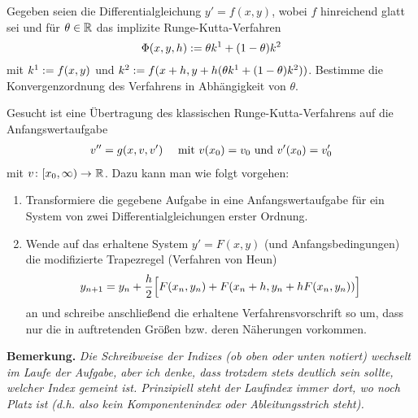 \begin{exercisePage}
	
	\setcounter{taskcount}{8}
	\begin{homework}
		Gegeben seien die Differentialgleichung $y' = f(x,y)$, wobei $f$ hinreichend glatt sei und für $\theta \in \mathbb{R}$ das implizite Runge-Kutta-Verfahren
		\begin{equation*}
			\Phi(x,y,h) \mathrel{:=} \theta k^1 + (1-\theta)k^2
		\end{equation*}
		mit $k^1 \mathrel{:=} f(x,y)$ und $k^2 \mathrel{:=} f(x+h,y+h(\theta k^1 + (1-\theta)k^2))$. Bestimme die Konvergenzordnung des Verfahrens in Abhängigkeit von $\theta$.
	\end{homework}

	\begin{homework}
		Gesucht ist eine Übertragung des klassischen Runge-Kutta-Verfahrens auf die Anfangswertaufgabe 
		\begin{align}
			v'' = g(x,v,v') \quad \text{ mit } v(x_0) = v_0 \text{ und } v'(x_0) = v_0' \label{t10: aw}
		\end{align}
		mit $\abb{v}{[x_0, \infty)}{\R}$. Dazu kann man wie folgt vorgehen:
		\begin{enumerate}[leftmargin=*, nolistsep, label=(\alph*)]
			\item Transformiere die gegebene Aufgabe in eine Anfangswertaufgabe für ein System von zwei Differentialgleichungen erster Ordnung.
			\item Wende auf das erhaltene System $y' = F(x,y)$ (und Anfangsbedingungen) die modifizierte Trapezregel (Verfahren von Heun) 
			\begin{equation*}
				y_{n+1} = y_n + \frac{h}{2} \Bigl[ F(x_n,y_n) + F(x_n + h , y_n + h F(x_n,y_n)) \Bigr]
			\end{equation*}
			an und schreibe anschließend die erhaltene Verfahrensvorschrift so um, dass nur die in 
			auftretenden Größen bzw. deren Näherungen vorkommen.
		\end{enumerate}
	\end{homework}

	\textbf{Bemerkung.} \textit{Die Schreibweise der Indizes (ob oben oder unten notiert) wechselt im Laufe der Aufgabe, aber ich denke, dass trotzdem stets deutlich sein sollte, welcher Index gemeint ist. Prinzipiell steht der Laufindex immer dort, wo noch Platz ist (d.h. also kein Komponentenindex oder Ableitungsstrich steht).}
	

\end{exercisePage}
